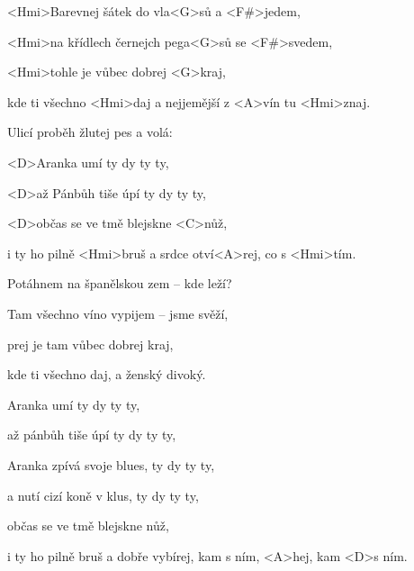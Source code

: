 

\zs
<Hmi>Barevnej šátek do vla<G>sů a <F#>jedem,

<Hmi>na křídlech černejch pega<G>sů se <F#>svedem,

<Hmi>tohle je vůbec dobrej <G>kraj,

kde ti všechno <Hmi>daj a nejjemější z <A>vín tu <Hmi>znaj.
\ks

\zs
Ulicí proběh žlutej pes a volá:

\ks

\zr
<D>Aranka umí  ty dy ty ty,

<D>až Pánbůh tiše úpí  ty dy ty ty,

<D>občas se ve tmě blejskne <C>nůž,

i ty ho pilně <Hmi>bruš a srdce otví<A>rej, co s <Hmi>tím.
\kr

\zs
Potáhnem na španělskou zem -- kde leží?

Tam všechno víno vypijem -- jsme svěží,

prej je tam vůbec dobrej kraj,

kde ti všechno daj, a ženský divoký.
\ks

\zr
Aranka umí  ty dy ty ty,

až pánbůh tiše úpí  ty dy ty ty,

Aranka zpívá svoje blues, ty dy ty ty,

a nutí cizí koně v klus, ty dy ty ty,

občas se ve tmě blejskne nůž,

i ty ho pilně bruš a dobře vybírej, kam s ním, <A>hej, kam <D>s ním.
\kr

\kp
